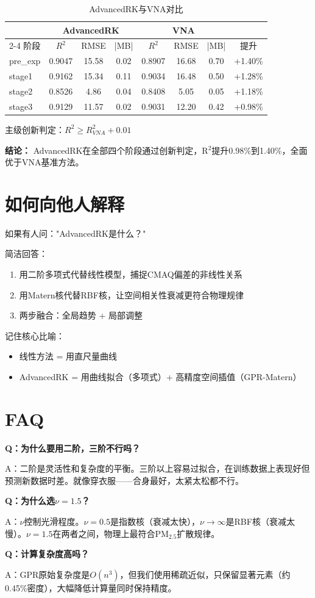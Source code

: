 \documentclass[UTF8, a4paper, 12pt]{article}
\begin{document}
\begin{table}[htbp]
\centering
\caption{AdvancedRK与VNA对比}
\begin{tabular}{@{}lccccccc@{}}
\toprule
 & \multicolumn{3}{c}{AdvancedRK} & \multicolumn{3}{c}{VNA} \\
\cmidrule{2-4} \cmidrule{5-7}
阶段 & $R^2$ & RMSE & |MB| & $R^2$ & RMSE & |MB| & 提升 \\
\midrule
pre\_exp & 0.9047 & 15.58 & 0.02 & 0.8907 & 16.68 & 0.70 & +1.40\% \\
stage1 & 0.9162 & 15.34 & 0.11 & 0.9034 & 16.48 & 0.50 & +1.28\% \\
stage2 & 0.8526 & 4.86 & 0.04 & 0.8408 & 5.05 & 0.05 & +1.18\% \\
stage3 & 0.9129 & 11.57 & 0.02 & 0.9031 & 12.20 & 0.42 & +0.98\% \\
\bottomrule
\end{tabular}
\end{table}

主级创新判定：$R^2 \geq R^2_{VNA} + 0.01$

\textbf{结论：} AdvancedRK在全部四个阶段通过创新判定，R$^2$提升0.98\%到1.40\%，全面优于VNA基准方法。

\section{如何向他人解释}

如果有人问："AdvancedRK是什么？"

简洁回答：
\begin{enumerate}
    \item 用二阶多项式代替线性模型，捕捉CMAQ偏差的非线性关系
    \item 用Matern核代替RBF核，让空间相关性衰减更符合物理规律
    \item 两步融合：全局趋势 + 局部调整
\end{enumerate}

记住核心比喻：
\begin{itemize}
    \item 线性方法 = 用直尺量曲线
    \item AdvancedRK = 用曲线拟合（多项式）+ 高精度空间插值（GPR-Matern）
\end{itemize}

\section{FAQ}

\textbf{Q：为什么要用二阶，三阶不行吗？}

A：二阶是灵活性和复杂度的平衡。三阶以上容易过拟合，在训练数据上表现好但预测新数据时差。就像穿衣服——合身最好，太紧太松都不行。

\textbf{Q：为什么选$\nu=1.5$？}

A：$\nu$控制光滑程度。$\nu=0.5$是指数核（衰减太快），$\nu \to \infty$是RBF核（衰减太慢）。$\nu=1.5$在两者之间，物理上最符合PM$_{2.5}$扩散规律。

\textbf{Q：计算复杂度高吗？}

A：GPR原始复杂度是$O(n^3)$，但我们使用稀疏近似，只保留显著元素（约0.45\%密度），大幅降低计算量同时保持精度。
\end{document}
